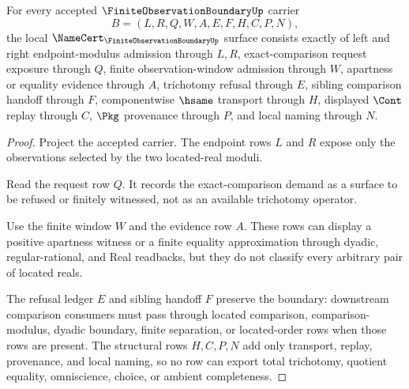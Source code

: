 \begin{theorem}
\label{thm:finite-observation-boundary-namecert-obligations}
For every accepted $\FiniteObservationBoundaryUp$ carrier
$$
B=(L,R,Q,W,A,E,F,H,C,P,N),
$$
the local $\NameCert_{\FiniteObservationBoundaryUp}$ surface consists exactly of left and right endpoint-modulus admission through $L,R$, exact-comparison request exposure through $Q$, finite observation-window admission through $W$, apartness or equality evidence through $A$, trichotomy refusal through $E$, sibling comparison handoff through $F$, componentwise $\hsame$ transport through $H$, displayed $\Cont$ replay through $C$, $\Pkg$ provenance through $P$, and local naming through $N$.
\end{theorem}
\begin{proof}
Project the accepted carrier. The endpoint rows $L$ and $R$ expose only the observations selected by the two located-real moduli.

Read the request row $Q$. It records the exact-comparison demand as a surface to be refused or finitely witnessed, not as an available trichotomy operator.

Use the finite window $W$ and the evidence row $A$. These rows can display a positive apartness witness or a finite equality approximation through dyadic, regular-rational, and Real readbacks, but they do not classify every arbitrary pair of located reals.

The refusal ledger $E$ and sibling handoff $F$ preserve the boundary: downstream comparison consumers must pass through located comparison, comparison-modulus, dyadic boundary, finite separation, or located-order rows when those rows are present. The structural rows $H,C,P,N$ add only transport, replay, provenance, and local naming, so no row can export total trichotomy, quotient equality, omniscience, choice, or ambient completeness.
\end{proof}



